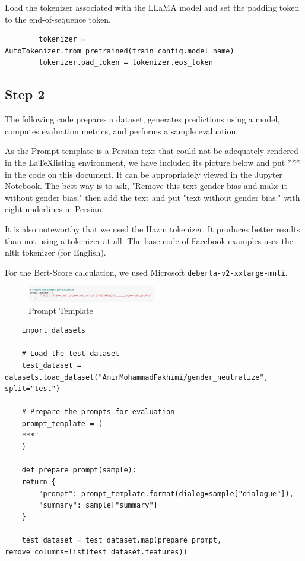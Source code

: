 \documentclass{solutionclass} %
\begin{document}
\begin{solution}
	Load the tokenizer associated with the LLaMA model and set the padding token to the end-of-sequence token.
	\begin{lstlisting}
		tokenizer = AutoTokenizer.from_pretrained(train_config.model_name)
		tokenizer.pad_token = tokenizer.eos_token
	\end{lstlisting}
\end{solution}


\subsection*{Step 2}

The following code prepares a dataset, generates predictions using a model, computes evaluation metrics, and performs a sample evaluation.

As the Prompt template is a Persian text that could not be adequately rendered in the \LaTeX listing environment, we have included its picture below and put *** in the code on this document. It can be appropriately viewed in the Jupyter Notebook. The best way is to ask, "Remove this text gender bias and make it without gender bias," then add the text and put "text without gender bias:" with eight underlines in Persian.

It is also noteworthy that we used the Hazm tokenizer. It produces better results than not using a tokenizer at all. The base code of Facebook examples uses the nltk tokenizer (for English).

For the Bert-Score calculation, we used Microsoft \verb|deberta-v2-xxlarge-mnli|.





\begin{figure}[h!]
	\caption{Prompt Template}
	\centering
	\includegraphics[width=0.5\textwidth]{img/Prompt.png}
\end{figure}



\begin{lstlisting}
	import datasets
	
	# Load the test dataset
	test_dataset = datasets.load_dataset("AmirMohammadFakhimi/gender_neutralize", split="test")
	
	# Prepare the prompts for evaluation
	prompt_template = (
	***"
	)
	
	def prepare_prompt(sample):
	return {
		"prompt": prompt_template.format(dialog=sample["dialogue"]),
		"summary": sample["summary"]
	}
	
	test_dataset = test_dataset.map(prepare_prompt, remove_columns=list(test_dataset.features))
\end{lstlisting}
\end{document}
